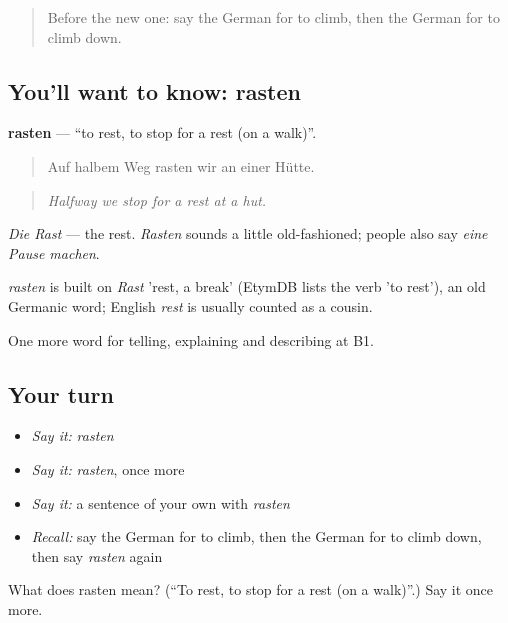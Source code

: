 \label{lesson:GE-C454-rasten}



\begin{quote}
Before the new one: say the German for to climb, then the German for to climb down.
\end{quote}

\subsection*{You'll want to know: rasten}
\textbf{rasten} — \textquotedblleft{}to rest, to stop for a rest (on a walk)\textquotedblright{}.

\begin{quote}
Auf halbem Weg rasten wir an einer Hütte.
\end{quote}

\begin{quote}
\emph{Halfway we stop for a rest at a hut.}
\end{quote}

\emph{Die Rast} — the rest. \emph{Rasten} sounds a little old-fashioned; people also say \emph{eine Pause machen}.

\begin{cousinweb}
\emph{rasten} is built on \emph{Rast} 'rest, a break' (EtymDB lists the verb 'to rest'), an old Germanic word; English \emph{rest} is usually counted as a cousin.
\end{cousinweb}

\begin{grammarlens}[title={What you've built}]
One more word for telling, explaining and describing at B1.
\end{grammarlens}

\subsection*{Your turn}
\begin{itemize}
\raggedright
  \item \emph{Say it:} \emph{rasten}
  \item \emph{Say it:} \emph{rasten}, once more
  \item \emph{Say it:} a sentence of your own with \emph{rasten}
  \item \emph{Recall:} say the German for to climb, then the German for to climb down, then say \emph{rasten} again
\end{itemize}

\begin{tcolorbox}[breakable,colback=teal!4,colframe=teal!35!black,title={Before you move on}]
What does rasten mean? (\textquotedblleft{}To rest, to stop for a rest (on a walk)\textquotedblright{}.) Say it once more.
\end{tcolorbox}
